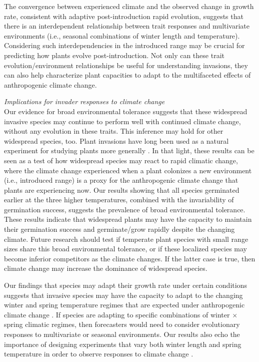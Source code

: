 \documentclass[11pt]{article}\usepackage[]{graphicx}\usepackage[]{color}
\begin{document}
	 The convergence between experienced climate and the observed change in growth rate, consistent with adaptive post-introduction rapid evolution, suggests that there is an interdependent relationship between trait responses and multivariate environments (i.e., seasonal combinations of winter length and temperature). Considering such interdependencies in the introduced range may be crucial for predicting how plants evolve post-introduction. Not only can these trait evolution/environment relationships be useful for understanding invasions, they can also help characterize plant capacities to adapt to the multifaceted effects of anthropogenic climate change. 

\emph{Implications for invader responses to climate change}\\ %
	Our evidence for broad environmental tolerance suggests that these widespread invasive species may continue to perform well with continued climate change, without any evolution in these traits. This inference may hold for other widespread species, too.  Plant invasions have long been used as a natural experiment for studying plants more generally \parencite[e.g., ][]{Yoshida2007}. In that light, these results can be seen as a test of how widespread species may react to rapid climatic change, where the climate change experienced when a plant colonizes a new environment (i.e., introduced range) is a proxy for the anthropogenic climate change that plants are experiencing now.  Our results showing that all species germinated earlier at the three higher temperatures, combined with the invariability of germination success, suggests the prevalence of broad environmental tolerance.  These results indicate that widespread plants may have the capacity to maintain their germination success and germinate/grow rapidly despite the changing climate. Future research should test if temperate plant species with small range sizes share this broad environmental tolerance, or if these localized species may become inferior competitors as the climate changes. If the latter case is true, then climate change may increase the dominance of widespread species. 
	
	 Our findings that species may adapt their growth rate under certain conditions suggests that invasive species may have the capacity to adapt to the changing winter and spring temperature regimes that are expected under anthropogenic climate change \parencite{IPCC2015}. If species are adapting to specific combinations of winter $\times$ spring climatic regimes, then forecasters would need to consider evolutionary responses to multivariate  or seasonal environments. Our results also echo the importance of designing experiments that vary both winter length and spring temperature in order to observe responses to climate change \parencite[e.g.,][]{Bernareggi2016}. 
\end{document}
